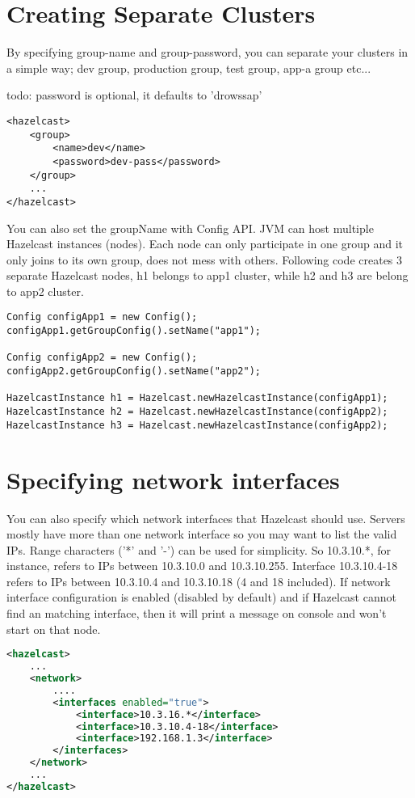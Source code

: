 \section{Creating Separate Clusters}

By specifying group-name and group-password, you can separate your clusters in a simple way; dev group, production group, test group, app-a group etc... 

todo: password is optional, it defaults to 'drowssap'

\begin{verbatim}
<hazelcast>
    <group>
        <name>dev</name>
        <password>dev-pass</password>
    </group>
    ...
</hazelcast>
\end{verbatim}
You can also set the groupName with Config API. JVM can host multiple Hazelcast instances (nodes). Each node can only participate in one group and it only joins to its own group, does not mess with others. Following code creates 3 separate Hazelcast nodes, h1 belongs to app1 cluster, while h2 and h3 are belong to app2 cluster.

\begin{lstlisting}
Config configApp1 = new Config();
configApp1.getGroupConfig().setName("app1");

Config configApp2 = new Config();
configApp2.getGroupConfig().setName("app2");

HazelcastInstance h1 = Hazelcast.newHazelcastInstance(configApp1);
HazelcastInstance h2 = Hazelcast.newHazelcastInstance(configApp2);
HazelcastInstance h3 = Hazelcast.newHazelcastInstance(configApp2);
\end{lstlisting}

\section{Specifying network interfaces}

You can also specify which network interfaces that Hazelcast should use. Servers mostly have more than one network interface so you may want to list the valid IPs. Range characters ('*' and '-') can be used for simplicity. So 10.3.10.*, for instance, refers to IPs between 10.3.10.0 and 10.3.10.255. Interface 10.3.10.4-18 refers to IPs between 10.3.10.4 and 10.3.10.18 (4 and 18 included). If network interface configuration is enabled (disabled by default) and if Hazelcast cannot find an matching interface, then it will print a message on console and won't start on that node.

\begin{lstlisting}[language=xml]
<hazelcast>
    ...
    <network>
        ....
        <interfaces enabled="true">
            <interface>10.3.16.*</interface> 
            <interface>10.3.10.4-18</interface> 
            <interface>192.168.1.3</interface>         
        </interfaces>    
    </network>
    ...
</hazelcast>
\end{lstlisting}

